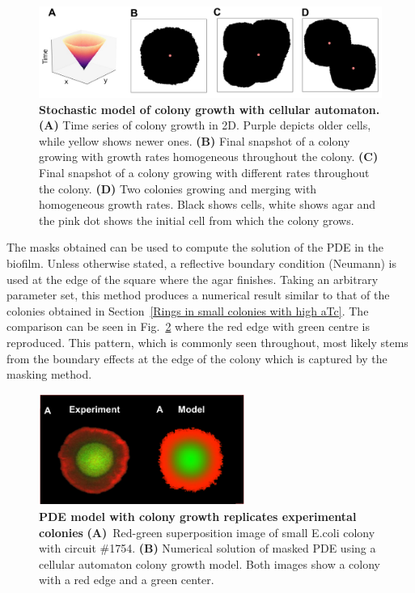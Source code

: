 \begin{figure}[H]
    \centering

    \includegraphics[width=1\textwidth]{chapters/Chapter 3/cas}
    \caption{\textbf{Stochastic model of colony growth with cellular automaton.} \textbf{(A)} Time series of colony growth in 2D. Purple depicts older cells, while yellow shows newer ones. \textbf{(B)} Final snapshot of a colony growing with growth rates homogeneous throughout the colony. \textbf{(C)} Final snapshot of a colony growing with different rates throughout the colony. \textbf{(D)} Two colonies growing and merging with homogeneous growth rates. Black shows cells, white shows agar and the pink dot shows the initial cell from which the colony grows.   }
    \label{cas}
\end{figure}
The masks obtained can be used to compute the solution of the PDE in the biofilm.
Unless otherwise stated, a reflective boundary condition (Neumann) is used at the edge of the square where the agar finishes.
Taking an arbitrary parameter set, this method produces a numerical result similar to that of the colonies obtained in Section~\ref{Rings in small colonies with high aTc}.
The comparison can be seen in Fig.~\ref{small colony experiment vs model} where the red edge with green centre is reproduced.
This pattern, which is commonly seen throughout, most likely stems from the boundary effects at the edge of the colony which is captured by the masking method.

\begin{figure}[H]
    \centering

    \includegraphics[width=0.6\textwidth]{chapters/Chapter 3/small colony experiment vs model}
    \caption{ \textbf{PDE model with colony growth replicates experimental colonies} \textbf{(A)}~Red-green superposition image of small E.coli colony with circuit \#1754.  \textbf{(B)} Numerical solution of masked PDE using a cellular automaton colony growth model. Both images show a colony with a red edge and a green center.}
    \label{small colony experiment vs model}
\end{figure}

